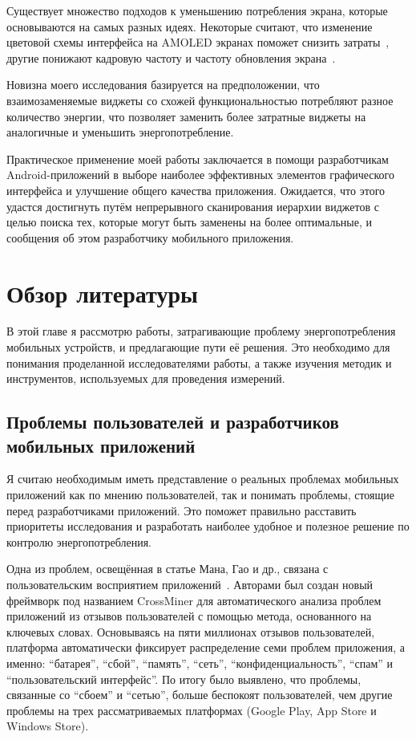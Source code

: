 \documentclass[a4paper,14pt]{extarticle} %
\begin{document}
	Существует множество подходов к уменьшению потребления экрана, которые основываются на самых разных идеях. Некоторые считают, что изменение цветовой схемы интерфейса на AMOLED экранах поможет снизить затраты~\parencite{wan2015detecting}, другие понижают кадровую частоту и частоту обновления экрана~\parencite{lee2018improving, huang2014intelligent}. 
	
	Новизна моего исследования базируется на предположении, что взаимозаменяемые виджеты со схожей функциональностью потребляют разное количество энергии, что позволяет заменить более затратные виджеты на аналогичные и уменьшить энергопотребление.
	
	Практическое применение моей работы заключается в помощи разработчикам Android-приложений в выборе наиболее эффективных элементов графического интерфейса и улучшение общего качества приложения. Ожидается, что этого удастся достигнуть путём непрерывного сканирования иерархии виджетов с целью поиска тех, которые могут быть заменены на более оптимальные, и сообщения об этом разработчику мобильного приложения.
	
	\newpage
	\section{Обзор литературы} %
	
	В этой главе я рассмотрю работы, затрагивающие проблему энергопотребления мобильных устройств, и предлагающие пути её решения. Это необходимо для понимания проделанной  исследователями работы, а также изучения методик и инструментов, используемых для проведения измерений.
	
	\subsection{Проблемы пользователей и разработчиков мобильных приложений}
	
	Я считаю необходимым иметь представление о реальных проблемах мобильных приложений как по мнению пользователей, так и понимать проблемы, стоящие перед разработчиками приложений. Это поможет правильно расставить приоритеты исследования и разработать наиболее удобное и полезное решение по контролю энергопотребления.
	
	Одна из проблем, освещённая в статье Мана, Гао и др., связана с пользовательским восприятием приложений~\parencite{man2016experience}. Авторами был создан новый фреймворк под названием CrossMiner для автоматического анализа проблем приложений из отзывов пользователей с помощью метода, основанного на ключевых словах. Основываясь на пяти миллионах отзывов пользователей, платформа автоматически фиксирует распределение семи проблем приложения, а именно: “батарея”, “сбой”, “память”, “сеть”, “конфиденциальность”, “спам” и “пользовательский интерфейс”. По итогу было выявлено, что проблемы, связанные со “сбоем” и “сетью”, больше беспокоят пользователей, чем другие проблемы на трех рассматриваемых платформах (Google Play, App Store и Windows Store).
	
\end{document}

